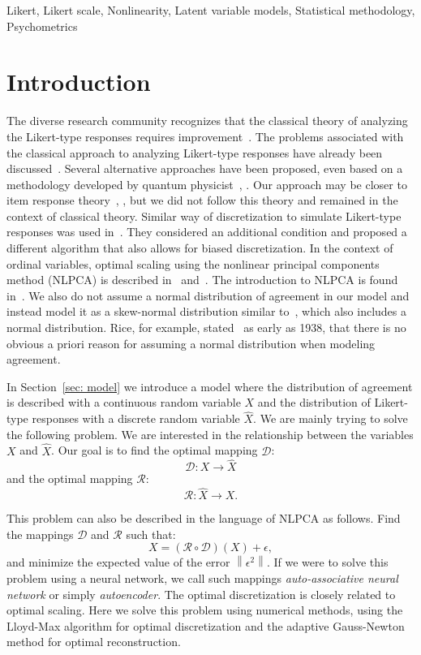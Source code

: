 \documentclass[10pt]{article}
\newcommand{\norm}[1]{\left\lVert#1\right\rVert}
\providecommand{\keywords}[1]{\textbf{\text{Keywords:}} #1}
\begin{document}
\keywords{Likert, Likert scale, Nonlinearity, Latent variable models, Statistical methodology, Psychometrics}

\tableofcontents


\section{Introduction}
The diverse research community recognizes that the classical theory of analyzing the Likert-type responses requires improvement~\cite{Alphen}. The problems associated with the classical approach to analyzing Likert-type responses have already been discussed~\cite{Harwell}. Several alternative approaches have been proposed, even based on a methodology developed by quantum physicist~\cite{Camparo1}, \cite{Camparo2}. Our approach may be closer to item response theory~\cite{Jabrayilov}, \cite{Magno}, but we did not follow this theory and remained in the context of classical theory. Similar way of discretization to simulate Likert-type responses was used in~\cite{Boari}. They considered an additional condition and proposed a different algorithm that also allows for biased discretization. In the context of ordinal variables, optimal scaling using the nonlinear principal components method (NLPCA) is described in~\cite{Young} and~\cite{Gifi}. The introduction to NLPCA is found in~\cite{DeLeeuw}. We also do not assume a normal distribution of agreement in our model and instead model it as a skew-normal distribution similar to~\cite{Eijk}, which also includes a normal distribution. Rice, for example, stated~\cite{Rice} as early as 1938, that there is no obvious a priori reason for assuming a normal distribution when modeling agreement.

In Section~\ref{sec: model} we introduce a model where the distribution of agreement is described with a continuous random variable $X$ and the distribution of Likert-type responses with a discrete random variable $\hat{X}$. We are mainly trying to solve the following problem. We are interested in the relationship between the variables $X$ and $\hat{X}$. Our goal is to find the optimal mapping $\mathcal{D}$:
\begin{equation}
\mathcal{D}: X \rightarrow \hat{X}
\end{equation}
and the optimal mapping $\mathcal{R}$:
\begin{equation}
\mathcal{R}: \hat{X} \rightarrow X.
\end{equation}

This problem can also be described in the language of NLPCA as follows. Find the mappings $\mathcal{D}$ and $\mathcal{R}$ such that:
\begin{equation}
X = \left( \mathcal{R} \circ \mathcal{D} \right) (X) + \epsilon,
\end{equation}
and minimize the expected value of the error $\norm{\epsilon^{2}}$. If we were to solve this problem using a neural network, we call such mappings {\it auto-associative neural network} or simply {\it autoencoder}. The optimal discretization is closely related to optimal scaling. Here we solve this problem using numerical methods, using the Lloyd-Max algorithm for optimal discretization and the adaptive Gauss-Newton method for optimal reconstruction. 
\end{document}
